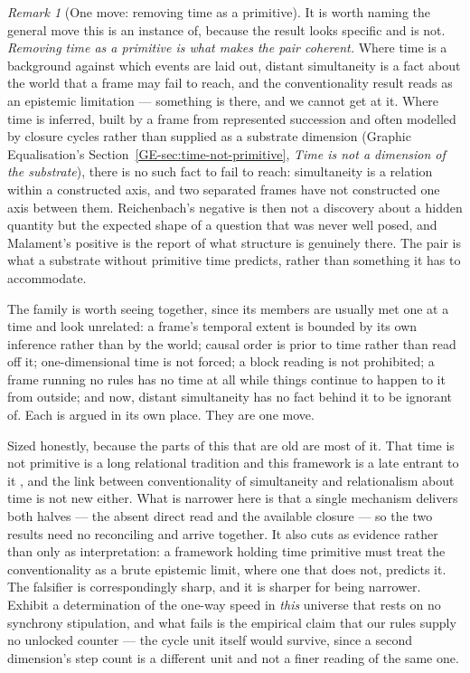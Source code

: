 \documentclass[11pt,a4paper]{article}
\theoremstyle{remark}\newtheorem{remark}[definition]{Remark}
\begin{document}
\begin{remark}[One move: removing time as a primitive]\label{rem:one-move}
It is worth naming the general move this is an instance of, because the result looks specific and is
not. \emph{Removing time as a primitive is what makes the pair coherent.} Where time is a background
against which events are laid out, distant simultaneity is a fact about the world that a frame may
fail to reach, and the conventionality result reads as an epistemic limitation --- something is
there, and we cannot get at it. Where time is inferred, built by a frame from represented succession and often modelled by
closure cycles rather than supplied as a substrate dimension (Graphic Equalisation's
Section~\ref{GE-sec:time-not-primitive}, \emph{Time is not a dimension of the substrate}), there is
no such fact to fail to reach:
simultaneity is a relation within a constructed axis, and two separated frames have not constructed
one axis between them. Reichenbach's negative is then not a discovery about a hidden quantity but the expected shape of a question that was never well
posed, and Malament's positive is the report of what structure is genuinely there. The pair is what a
substrate without primitive time predicts, rather than something it has to accommodate.

The family is worth seeing together, since its members are usually met one at a time and look
unrelated: a frame's temporal extent is bounded by its own inference rather than by the world; causal
order is prior to time rather than read off it; one-dimensional time is not forced; a block reading
is not prohibited; a frame running no rules has no time at all while things continue to happen to it
from outside; and now, distant simultaneity has no fact behind it to be ignorant of. Each is argued
in its own place. They are one move.

Sized honestly, because the parts of this that are old are most of it. That time is not primitive is
a long relational tradition and this framework is a late entrant to it \citep{rovelli1996}, and the
link between conventionality of simultaneity and relationalism about time is not new either. What is
narrower here is that a single mechanism delivers both halves --- the absent direct read and the
available closure --- so the two results need no reconciling and arrive together. It also cuts as
evidence rather than only as interpretation: a framework holding time primitive must treat the
conventionality as a brute epistemic limit, where one that does not, predicts it. The falsifier is
correspondingly sharp, and it is sharper for being narrower. Exhibit a determination
of the one-way speed in \emph{this} universe that rests on no synchrony stipulation, and what fails is
the empirical claim that our rules supply no unlocked counter --- the cycle unit itself would survive,
since a second dimension's step count is a different unit and not a finer reading of the same one.
\end{remark}
\end{document}
